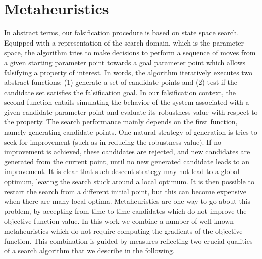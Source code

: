 \section{Metaheuristics}\label{Solvers}
In abstract terms, our falsification procedure is based on state space search. Equipped with a representation of the search domain, which is the parameter space, the algorithm tries to make decisions to perform a sequence of moves from a given starting parameter point towards a goal parameter point which allows falsifying a property of interest. In words, the algorithm iteratively executes two abstract functions: (1) generate a set of candidate points and (2) test if the candidate set satisfies the falsification goal. In our falsification context, the second function entails simulating the behavior of the system associated with a given candidate parameter point and evaluate its robustness value with respect to the property. The search performance mainly depends on the first function, namely generating candidate points. One natural strategy of generation is tries to seek for improvement (such as in reducing the robustness value). If no improvement is achieved, these candidates are rejected, and new candidates are generated from the current point, until no new generated candidate leads to an improvement. It is clear that such descent strategy may not lead to a global optimum, leaving the search stuck around a local optimum. It is then possible to restart the search from a different initial point, but this can become expensive when there are many local optima. Metaheuristics \cite{} are one way to go about this problem, by accepting from time to time candidates which do not improve the objective function value. In this work we combine a number of well-known metaheuristics which do not require computing the gradients of the objective function. This combination is guided by measures reflecting two crucial qualities of a search algorithm that we describe in the following. %


